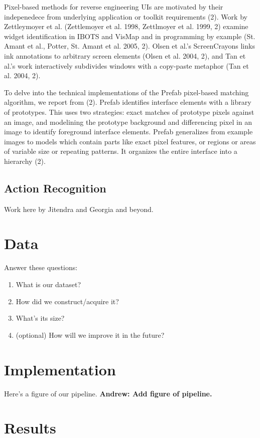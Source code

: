 \documentclass[12pt]{memoir}
\begin{document}
Pixel-based methods for reverse engineering UIs are motivated by their 
indepenedece from underlying application or toolkit requirements (2).  Work 
by Zettleymoyer et al. (Zettlemoyer et al. 1998, Zettlmoyer et al. 1999, 2) 
examine widget identification in IBOTS and VisMap and in programming by 
example (St. Amant et al., Potter, St. Amant et al. 2005, 2).  Olsen et al.'s 
ScreenCrayons links ink annotations to arbitrary screen elements (Olsen et al. 
2004, 2), and Tan et al.'s work interactively subdivides windows with a 
copy-paste metaphor (Tan et al. 2004, 2).

To delve into the technical implementations of the Prefab pixel-based 
matching algorithm, we report from (2).  Prefab identifies interface elements 
with a library of prototypes.  This uses two strategies: exact matches of 
prototype pixels against an image, and modelining the prototype background 
and differencing pixel in an image to identify foreground interface elements.  
Prefab generalizes from example images to models which contain parts like 
exact pixel features, or regions or areas of variable size or repeating 
patterns.  It organizes the entire interface into a hierarchy (2).

\subsection{Action Recognition}

Work here by Jitendra and Georgia and beyond.

\section{Data}

Answer these questions:
\begin{enumerate}[noitemsep]
\item What is our dataset?
\item How did we construct/acquire it?
\item What's its size?
\item (optional) How will we improve it in the future?
\end{enumerate}


\section{Implementation}
Here's a figure of our pipeline.  \textbf{Andrew: Add figure of pipeline.}


\section{Results}
\end{document}
